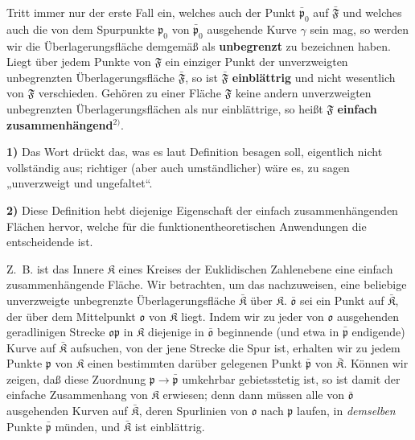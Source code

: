 \documentclass{article}
\begin{document}
Tritt immer nur der erste Fall ein, welches auch der Punkt $\bar{\mathfrak{p}}_0$ auf $\bar{\mathfrak{F}}$ und welches auch die von dem Spurpunkte $\mathfrak{p}_0$ von $\bar{\mathfrak{p}}_0$ ausgehende Kurve $\gamma$ sein mag, so werden wir die Überlagerungsfläche demgemäß als \textbf{unbegrenzt} zu bezeichnen haben. Liegt über jedem Punkte von $\mathfrak{F}$ ein einziger Punkt der unverzweigten unbegrenzten Überlagerungsfläche $\bar{\mathfrak{F}}$, so ist $\bar{\mathfrak{F}}$ \textbf{einblättrig} und nicht wesentlich von $\mathfrak{F}$ verschieden. Gehören zu einer Fläche $\mathfrak{F}$ keine andern unverzweigten unbegrenzten Überlagerungsflächen als nur einblättrige, so heißt $\mathfrak{F}$ \textbf{einfach zusammenhängend}${}^{2)}$.

\textbf{1)} Das Wort drückt das, was es laut Definition besagen soll, eigentlich nicht vollständig aus; richtiger (aber auch umständlicher) wäre es, zu sagen „unverzweigt und ungefaltet“.

\textbf{2)} Diese Definition hebt diejenige Eigenschaft der einfach zusammenhängenden Flächen hervor, welche für die funktionentheoretischen Anwendungen die entscheidende ist.

Z.~B. ist das Innere $\mathfrak{K}$ eines Kreises der Euklidischen Zahlenebene eine einfach zusammenhängende Fläche. Wir betrachten, um das nachzuweisen, eine beliebige unverzweigte unbegrenzte Überlagerungsfläche $\bar{\mathfrak{K}}$ über $\mathfrak{K}$. $\bar{\mathfrak{o}}$ sei ein Punkt auf $\bar{\mathfrak{K}}$, der über dem Mittelpunkt $\mathfrak{o}$ von $\mathfrak{K}$ liegt. Indem wir zu jeder von $\mathfrak{o}$ ausgehenden geradlinigen Strecke $\mathfrak{o}\mathfrak{p}$ in $\mathfrak{K}$ diejenige in $\bar{\mathfrak{o}}$ beginnende (und etwa in $\bar{\mathfrak{p}}$ endigende) Kurve auf $\bar{\mathfrak{K}}$ aufsuchen, von der jene Strecke die Spur ist, erhalten wir zu jedem Punkte $\mathfrak{p}$ von $\mathfrak{K}$ einen bestimmten darüber gelegenen Punkt $\bar{\mathfrak{p}}$ von $\bar{\mathfrak{K}}$. Können wir zeigen, daß diese Zuordnung $\mathfrak{p} \to \bar{\mathfrak{p}}$ umkehrbar gebietsstetig ist, so ist damit der einfache Zusammenhang von $\mathfrak{K}$ erwiesen; denn dann müssen alle von $\bar{\mathfrak{o}}$ ausgehenden Kurven auf $\bar{\mathfrak{K}}$, deren Spurlinien von $\mathfrak{o}$ nach $\mathfrak{p}$ laufen, in \emph{demselben} Punkte $\bar{\mathfrak{p}}$ münden, und $\bar{\mathfrak{K}}$ ist einblättrig.
\end{document}
